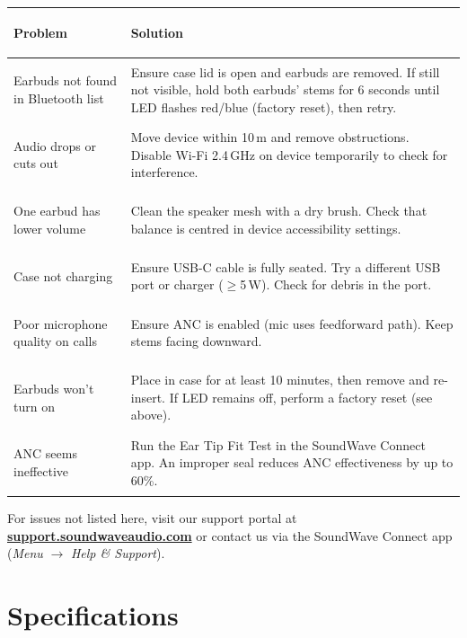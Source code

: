 \documentclass[11pt, a4paper]{article}
\begin{document}
\begin{tabularx}{\linewidth}{@{}
  >{\color{accent}\bfseries\raggedright}p{52mm}
  @{\hspace{6mm}}
  >{\raggedright\arraybackslash}X
@{}}
\toprule
\textcolor{accent}{Problem} & \textbf{Solution} \\
\midrule
Earbuds not found in Bluetooth list
  & Ensure case lid is open and earbuds are removed. If still not visible, hold both
    earbuds' stems for 6 seconds until LED flashes red/blue (factory reset), then retry. \\
\addlinespace
Audio drops or cuts out
  & Move device within 10\,m and remove obstructions. Disable Wi-Fi 2.4\,GHz on device
    temporarily to check for interference. \\
\addlinespace
One earbud has lower volume
  & Clean the speaker mesh with a dry brush. Check that balance is centred in device
    accessibility settings. \\
\addlinespace
Case not charging
  & Ensure USB-C cable is fully seated. Try a different USB port or charger ($\geq$5\,W).
    Check for debris in the port. \\
\addlinespace
Poor microphone quality on calls
  & Ensure ANC is enabled (mic uses feedforward path). Keep stems facing downward. \\
\addlinespace
Earbuds won't turn on
  & Place in case for at least 10 minutes, then remove and re-insert. If LED remains off,
    perform a factory reset (see above). \\
\addlinespace
ANC seems ineffective
  & Run the Ear Tip Fit Test in the SoundWave Connect app. An improper seal reduces
    ANC effectiveness by up to 60\%. \\
\bottomrule
\end{tabularx}

\setlength{\parskip}{4pt}
\renewcommand{\arraystretch}{1}

\vspace{6pt}
\begin{infobox}
  For issues not listed here, visit our support portal at
  \href{https://support.soundwaveaudio.com}{\textbf{support.soundwaveaudio.com}} or contact us
  via the SoundWave Connect app (\textit{Menu} $\to$ \textit{Help \& Support}).
\end{infobox}

\section{Specifications}
\end{document}
